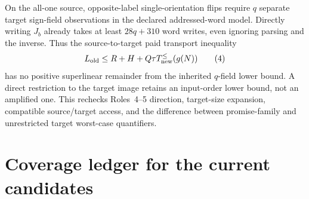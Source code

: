 \documentclass[11pt]{article}
\begin{document}
On the all-one source, opposite-label single-orientation flips
require $q$ separate target sign-field observations in the declared
addressed-word model. Directly writing $J_b$ already takes at least
$28q+310$ word writes, even ignoring parsing and the inverse. Thus
the source-to-target paid transport inequality
\[
L_{\rm old}\le R+H+Q\tau T_{\rm new}^{\le}(g(N))
\tag{4}
\]
has no positive superlinear remainder from the inherited $q$-field
lower bound. A direct restriction to the target image retains
an input-order lower bound, not an amplified one.
This rechecks Roles~4--5 direction, target-size expansion, compatible
source/target access, and the difference between promise-family
and unrestricted target worst-case quantifiers.

\section{Coverage ledger for the current candidates}
\renewcommand{\arraystretch}{1.23}
\footnotesize
\end{document}
